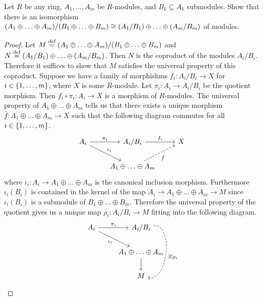 \documentclass{./typewriter-math}
\begin{document}
	\begin{exercise}[(DF 12.1.7)]
		Let \(R\) be any ring, \(A_1,\ldots,A_m\) be \(R\)-modules, and \(B_k
		\subseteq A_k\) submodules. Show that there is an isomorphism \({\left(A_1 \oplus
		\ldots \oplus A_m\right)}/{\left(B_1 \oplus \ldots \oplus B_m\right)} \cong
		{\left(A_1/B_1\right)} \oplus \ldots \oplus {\left(A_m/B_m\right)}\) of modules.

		\begin{proof}
			Let \(M \overset{\normalfont{\text{def}}}{=} {\left(A_1 \oplus \ldots \oplus A_m\right)}/{\left(B_1 \oplus
			\ldots \oplus B_m\right)}\) and \(N \overset{\normalfont{\text{def}}}{=} {\left(A_1/B_1\right)} \oplus \ldots \oplus
			{\left(A_m/B_m\right)}\). Then \(N\) is the coproduct of the modules \(A_i/B_i\).
			Therefore it suffices to show that \(M\) satisfies the universal property
			of this coproduct. Suppose we have a family of morphishms \(f_i: A_i/B_i
			\to X\) for \(i \in {\left\{1,\ldots,m\right\}}\), where \(X\) is some
			\(R\)-module. Let \(\pi_i: A_i \to A_i/B_i\) be the quotient morphism.
			Then \(f_i \circ \pi_i : A_i \to X\) is a morphism of \(R\)-modules. The
			universal property of \(A_1 \oplus \ldots \oplus A_m\) tells us that there
			exists a unique morphism \(\hat{f}: A_1 \oplus \ldots \oplus A_m \to X\)
			such that the following diagram commutes for all \(i \in
			{\left\{1,\ldots,m\right\}}\).%
			\begin{equation}\label{eq:f-hat}%
				\begin{tikzcd}
					A_i \arrow[r,"\pi_i"] \arrow[dr,"\iota_i"] & A_i/B_i \arrow[r,"f_i"] &
					X\\
					& A_1 \oplus \ldots \oplus A_m \arrow[ur,"\hat{f}",dashed,swap] & 
				\end{tikzcd}
			\end{equation}%
			where \(\iota_i: A_i \to A_1 \oplus \ldots \oplus A_m\) is the canonical
			inclusion morphism.  Furthermore \(\iota_i(B_i)\) is contained in the
			kernel of the map \(A_i \to A_1 \oplus \ldots \oplus A_m \to M\) since
			\(\iota_i(B_i)\) is a submodule of \(B_1 \oplus \ldots \oplus B_m\).
			Therefore the universal property of the quotient gives us a unique map
			\(\rho_i: A_i/B_i \to M\) fitting into the following diagram.%
			\begin{equation}\label{eq:rho-i}%
				\begin{tikzcd}
					A_i \arrow[r,"\pi_i"] \arrow[dr,"\iota_i",swap] & A_i/B_i
					\arrow[dd,"\exists !  \rho_i",dashed, bend left=100]\\
					& A_1 \oplus \ldots \oplus A_m \arrow[d] \\
					& M
				\end{tikzcd}

\end{equation}
\end{proof}
\end{exercise}
\end{document}
